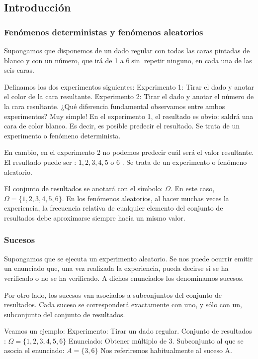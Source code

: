\documentclass[
]{article}
\begin{document}
\subsection{Introducción}\label{introducciuxf3n}

\subsubsection{Fenómenos deterministas y fenómenos aleatorios}\label{fenuxf3menos-deterministas-y-fenuxf3menos-aleatorios}

Supongamos que disponemos de un dado regular con todas las caras
pintadas de blanco y con un número, que irá de 1 a \(6 \sin\) repetir
ninguno, en cada una de las seis caras.

Definamos los dos experimentos siguientes: Experimento 1: Tirar el dado
y anotar el color de la cara resultante. Experimento 2: Tirar el dado y
anotar el número de la cara resultante. ¿Qué diferencia fundamental
observamos entre ambos experimentos? Muy simple! En el experimento 1, el
resultado es obvio: saldrá una cara de color blanco. Es decir, es
posible predecir el resultado. Se trata de un experimento o fenómeno
determinista.

En cambio, en el experimento 2 no podemos predecir cuál será el valor
resultante. El resultado puede ser : \(1,2,3,4,5\) o 6 . Se trata de un
experimento o fenómeno aleatorio.

El conjunto de resultados se anotará con el símbolo: \(\Omega\). En este
caso, \(\Omega=\{1,2,3,4,5,6\}\). En los fenómenos aleatorios, al hacer
muchas veces la experiencia, la frecuencia relativa de cualquier
elemento del conjunto de resultados debe aproximarse siempre hacia un
mismo valor.

\subsubsection{Sucesos}\label{sucesos}

Supongamos que se ejecuta un experimento aleatorio. Se nos puede ocurrir
emitir un enunciado que, una vez realizada la experiencia, pueda decirse
si se ha verificado o no se ha verificado. A dichos enunciados los
denominamos sucesos.

Por otro lado, los sucesos van asociados a subconjuntos del conjunto de
resultados. Cada suceso se corresponderá exactamente con uno, y sólo con
un, subconjunto del conjunto de resultados.

Veamos un ejemplo: Experimento: Tirar un dado regular. Conjunto de
resultados : \(\Omega=\{1,2,3,4,5,6\}\) Enunciado: Obtener múltiplo de 3.
Subconjunto al que se asocia el enunciado: \(A=\{3,6\}\) Nos referiremos
habitualmente al suceso A.
\end{document}

